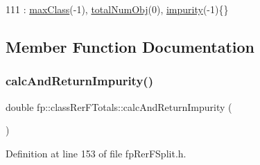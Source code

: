 \begin{DoxyCode}
111 : \hyperlink{classfp_1_1classRerFTotals_a365f8e9aca77f5794fa1bc5fdd504670}{maxClass}(-1), \hyperlink{classfp_1_1classRerFTotals_a0963284a03586b3a25c284bdb35f9e44}{totalNumObj}(0), \hyperlink{classfp_1_1classRerFTotals_a8dfed045129bbae0420ff4094c137b1a}{impurity}(-1)\{\}
\end{DoxyCode}


\subsection{Member Function Documentation}
\mbox{\label{classfp_1_1classRerFTotals_acb145c7c137fecc8766b9616f80daff2}} 
\subsubsection{\texorpdfstring{calc\+And\+Return\+Impurity()}{calcAndReturnImpurity()}}
{\footnotesize\ttfamily double fp\+::class\+Rer\+F\+Totals\+::calc\+And\+Return\+Impurity (\begin{DoxyParamCaption}{ }\end{DoxyParamCaption})\hspace{0.3cm}{\ttfamily [inline]}}



Definition at line 153 of file fp\+Rer\+F\+Split.\+h.


